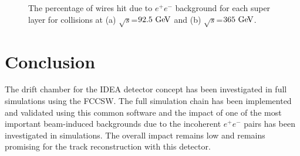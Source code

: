 \documentclass{article}
\begin{document}
\begin{figure}[!h]
\hfil
{}
\caption{The percentage of wires hit due to $e^+e^-$ background for each super layer for collisions at (a) $\sqrt{s}$=$92.5\,\mathrm{\,Ge\kern -0.1em V}$ and (b) $\sqrt{s}$=$365\,\mathrm{\,Ge\kern -0.1em V}$.}
\label{fig_simhitspercent}
\end{figure}


\section{Conclusion}
The drift chamber for the IDEA detector concept has been investigated in full simulations using the FCCSW. The full simulation chain has been implemented and validated using this common software and the impact of one of the most important beam-induced backgrounds due to the incoherent $e^+e^-$ pairs has been investigated in simulations. The overall impact remains low and remains promising for the track reconstruction with this detector.



\end{document}
